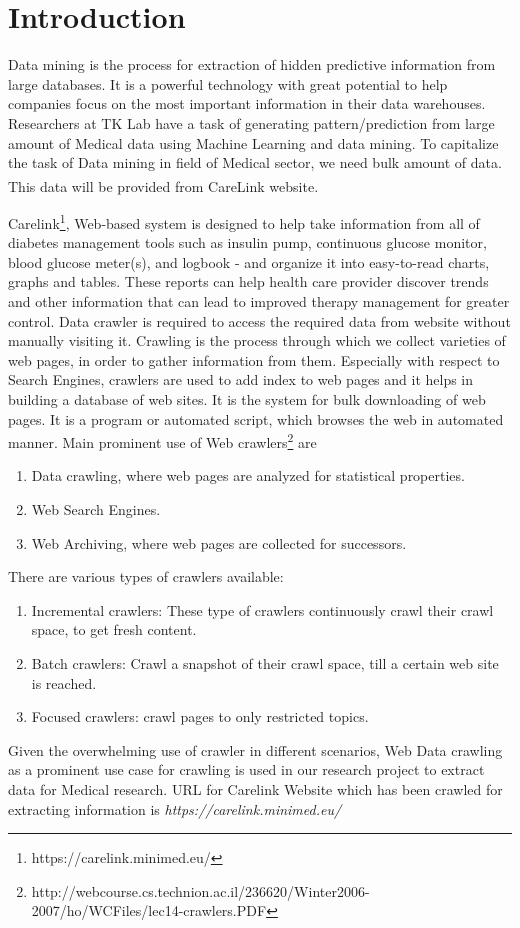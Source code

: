 \documentclass[article,type=msc,colorback,accentcolor=tud9c,twoside,11pt]{tudthesis}
\begin{document}
\clearpage
{}
\section{Introduction}
Data mining is the process for extraction of hidden predictive information from large databases. It is a powerful technology with great potential to help companies focus on the most important information in their data warehouses. Researchers at TK Lab have a task of generating pattern/prediction from large amount of Medical data using Machine Learning and data mining. To capitalize the task of Data mining in field of Medical sector, we need bulk amount of data. This data will be provided from CareLink\textsuperscript{\textregistered} website. 

Carelink\footnote{https://carelink.minimed.eu/}, Web-based system is designed to help take information from all of diabetes management tools such as insulin pump, continuous glucose monitor, blood glucose meter(s), and logbook - and organize it into easy-to-read charts, graphs and tables. These reports can help health care provider discover trends and other information that can lead to improved therapy management for greater control.
Data crawler is required to access the required data from website without manually visiting it. Crawling is the process through which we collect varieties of web pages, in order to gather information from them. Especially with respect to Search Engines, crawlers are used to add index to web pages and it helps in building a database of web sites. It is the system for bulk downloading of web pages. It is a program or automated script, which browses the web in automated manner. Main prominent use of Web crawlers\footnote{http://webcourse.cs.technion.ac.il/236620/Winter2006-2007/ho/WCFiles/lec14-crawlers.PDF} are
\begin{enumerate}
\item	Data crawling, where web pages are analyzed for statistical properties.
\item	Web Search Engines.
\item	Web Archiving, where web pages are collected for successors.
\end{enumerate}
There are various types of crawlers available:
\begin{enumerate}
\item	Incremental crawlers: These type of crawlers continuously crawl their crawl space, to get fresh content.
\item	Batch crawlers: Crawl a snapshot of their crawl space, till a certain web site is reached.
\item	Focused crawlers: crawl pages to only restricted topics.
\end{enumerate}
Given the overwhelming use of crawler in different scenarios, Web Data crawling as a prominent use case for crawling is used in our research project to extract data for Medical research. URL for Carelink Website which has been crawled for extracting information is \textit{https://carelink.minimed.eu/}
\end{document}
